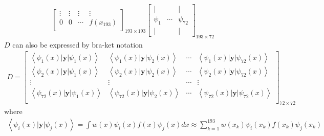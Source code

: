 \begin{definition}
\begin{align*}
\begin{bmatrix}
          \vdots & \vdots & \vdots & \vdots \\
          0 & 0 & \cdots & f(x_{193}) \\
          \end{bmatrix}_{193 \times 193}
          \begin{bmatrix}
                \vert & & \vert \\
                \psi_1   & \cdots & \psi_{72} \\
                \vert &  & \vert
          \end{bmatrix}_{193 \times 72}    
\end{align*}
$D$ can also be expressed by bra-ket notation
\begin{align*}
        D=\begin{bmatrix}
                \left< \psi_1(x) | \textbf{y} | \psi_1(x) \right> & \left< \psi_1(x) | \textbf{y} | \psi_2(x) \right> & \cdots & \left< \psi_1(x) | \textbf{y} | \psi_{72}(x) \right> \\
                \left< \psi_2(x) | \textbf{y} | \psi_1(x) \right> & \left< \psi_2(x) | \textbf{y} | \psi_2(x) \right> & \cdots & \left< \psi_2(x) | \textbf{y} | \psi_{72}(x) \right> \\
                \vdots & \vdots & \cdots & \vdots \\
                \left< \psi_{72}(x) | \textbf{y} | \psi_1(x) \right> & \left< \psi_{72}(x) | \textbf{y} | \psi_2(x) \right> & \cdots & \left< \psi_{72}(x) | \textbf{y} | \psi_{72}(x) \right> \\
                \end{bmatrix}_{72 \times 72}
\end{align*}
where
\begin{align*}
        \left< \psi_i(x) | \textbf{y} | \psi_j(x) \right> = \int w(x) \psi_i(x) f(x) \psi_j(x) dx \approx \sum_{k=1}^{193} w(x_k) \psi_i(x_k) f(x_k) \psi_j(x_k)
\end{align*}
\end{definition}